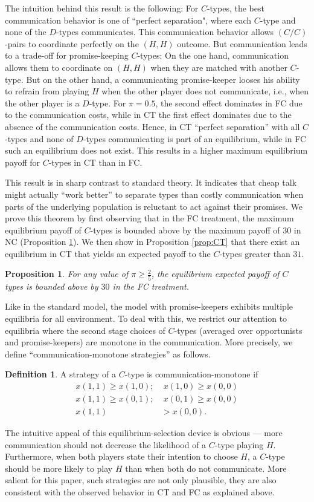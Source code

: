 \documentclass[12pt]{article}
\newtheorem{proposition}{Proposition} \theoremstyle{definition}
\newtheorem{definition}{Definition}
\theoremstyle{break}
\begin{document}
The intuition behind this result is the following: For $C$-types, the best communication behavior is one of ``perfect separation", where each $C$-type and none of the $D$-types communicates. This communication behavior allows $(C/C)$-pairs to coordinate perfectly on the $(H,H)$ outcome. But communication leads to a trade-off for promise-keeping $C$-types: On the one hand, communication allows them to coordinate on $(H,H)$ when they are matched with another $C$-type. But on the other hand, a communicating promise-keeper looses his ability to refrain from playing $H$ when the other player does not communicate, i.e., when the other player is a $D$-type. For $\pi=0.5$, the second effect dominates in FC due to the communication costs, while in CT the first effect dominates due to the absence of the communication costs. Hence, in CT ``perfect separation'' with all $C$-types and none of $D$-types communicating is part of an equilibrium, while in FC such an equilibrium does not exist. This results in a higher maximum equilibrium payoff for $C$-types in CT than in FC.

This result is in sharp contrast to standard theory. It indicates that cheap talk might actually ``work better'' to separate types than costly communication when parts of the underlying population is reluctant to act against their promises. We prove this theorem by first observing that in the FC treatment, the maximum equilibrium payoff of $C$-types is bounded above by the maximum payoff of $30$ in NC (Proposition \ref{prop:FC-bounded}). We then show in Proposition \ref{prop:CT} that there exist an equilibrium in CT that yields an expected payoff to the $C$-types greater than $31$. 

\begin{proposition}\label{prop:FC-bounded}
	For any value of $\pi\geq \frac{2}{5}$, the equilibrium expected payoff of $C$ types is bounded above by $30$ in the FC treatment.
\end{proposition}
%
Like in the standard model, the model with promise-keepers exhibits multiple equilibria for all environment. To deal with this, we restrict our attention to equilibria where the second stage choices of $C$-types (averaged over opportunists and promise-keepers) are monotone in the communication. More precisely, we define ``communication-monotone strategies'' as follows.
\begin{definition}
	A strategy of a $C$-type is communication-monotone if 
	\begin{align*}
x(1,1)\geq x(1,0);&\;x(1,0) \geq x(0,0)\\
x(1,1) \geq x(0,1);&\;x(0,1)\geq x(0,0)\\	
x(1,1)&>x(0,0).
\end{align*}
\end{definition}
The intuitive appeal of this equilibrium-selection device is obvious --- more communication should not decrease the likelihood of a $C$-type playing $H$. Furthermore, when both players state their intention to choose $H$, a $C$-type should be more likely to play $H$ than when both do not communicate. More salient for this paper, such strategies are not only plausible, they are also consistent with the observed behavior in CT and FC as explained above.
\end{document}

